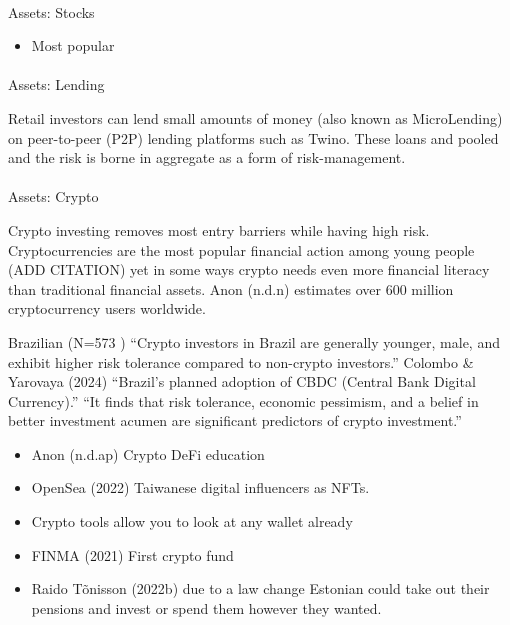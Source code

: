 \documentclass[
  letterpaper,
  DIV=11,
  numbers=noendperiod]{scrartcl}
\makeatletter
\let\oldparagraph\paragraph
\renewcommand{\paragraph}{
    \@ifstar
      \xxxParagraphStar
      \xxxParagraphNoStar
  }
\newcommand{\xxxParagraphStar}[1]{\oldparagraph*{#1}\mbox{}}
\newcommand{\xxxParagraphNoStar}[1]{\oldparagraph{#1}\mbox{}}
\providecommand{\tightlist}{%
  \setlength{\itemsep}{0pt}\setlength{\parskip}{0pt}}\usepackage{longtable,booktabs,array}
\makeatother
\begin{document}
\paragraph{Assets: Stocks}\label{assets-stocks}

\begin{itemize}
\tightlist
\item
  Most popular
\end{itemize}

\paragraph{Assets: Lending}\label{assets-lending}

Retail investors can lend small amounts of money (also known as
MicroLending) on peer-to-peer (P2P) lending platforms such as Twino.
These loans and pooled and the risk is borne in aggregate as a form of
risk-management.

\paragraph{Assets: Crypto}\label{assets-crypto}

Crypto investing removes most entry barriers while having high risk.
Cryptocurrencies are the most popular financial action among young
people (ADD CITATION) yet in some ways crypto needs even more financial
literacy than traditional financial assets. Anon (n.d.n) estimates over
600 million cryptocurrency users worldwide.

Brazilian (N=573 ) ``Crypto investors in Brazil are generally younger,
male, and exhibit higher risk tolerance compared to non-crypto
investors.'' Colombo \& Yarovaya (2024) ``Brazil's planned adoption of
CBDC (Central Bank Digital Currency).'' ``It finds that risk tolerance,
economic pessimism, and a belief in better investment acumen are
significant predictors of crypto investment.''

\begin{itemize}
\item
  Anon (n.d.ap) Crypto DeFi education
\item
  OpenSea (2022) Taiwanese digital influencers as NFTs.
\item
  Crypto tools allow you to look at any wallet already
\item
  FINMA (2021) First crypto fund
\item
  Raido Tõnisson (2022b) due to a law change Estonian could take out
  their pensions and invest or spend them however they wanted.
\end{itemize}
\end{document}
